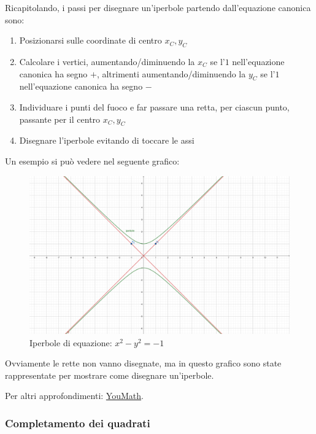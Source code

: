 \documentclass[a4paper]{article}
\begin{document}
	\noindent
	Ricapitolando, i passi per disegnare un'iperbole partendo dall'equazione canonica sono:
	\begin{enumerate}
		\item Posizionarsi sulle coordinate di centro $x_{C}, y_{C}$

		\item Calcolare i vertici, aumentando/diminuendo la $x_{C}$ se l'$1$ nell'equazione canonica ha segno $+$, altrimenti aumentando/diminuendo la $y_{C}$ se l'$1$ nell'equazione canonica ha segno $-$
		
		\item Individuare i punti del fuoco e far passare una retta, per ciascun punto, passante per il centro $x_{C}, y_{C}$
		
		\item Disegnare l'iperbole evitando di toccare le assi
	\end{enumerate}
	Un esempio si può vedere nel seguente grafico:
	\begin{figure}[!htp]
		\centering
		\includegraphics[width=.7\textwidth]{img/iperbole_esempio.pdf}
		\caption*{Iperbole di equazione: $x^{2} - y^{2} = -1$}
	\end{figure}

	\noindent
	Ovviamente le rette non vanno disegnate, ma in questo grafico sono state rappresentate per mostrare come disegnare un'iperbole.

	\noindent
	Per altri approfondimenti: \href{https://www.youmath.it/formulari/formulari-di-geometria-analitica/453-iperbole-nel-piano-cartesiano.html}{YouMath}.\newpage
	
	\subsubsection{Completamento dei quadrati}\label{subsubsection: completamento dei quadrati}
	
\end{document}
